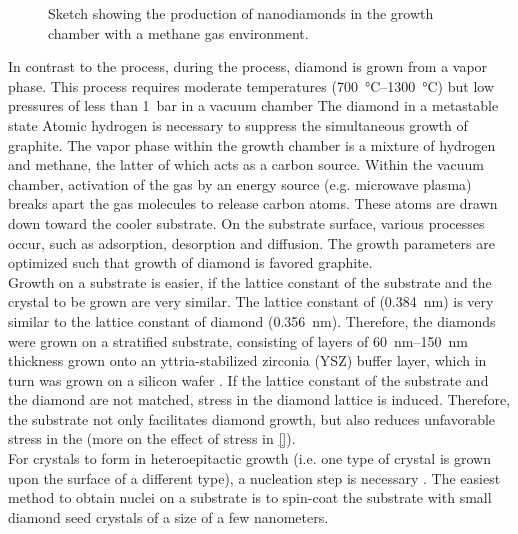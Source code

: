 	\begin{figure}[tp]
		\centering
		\caption{Sketch showing the production of \CVD nanodiamonds in the growth chamber with a methane gas environment.}
		\label{fig::cvd_sketch}
	\end{figure}

	In contrast to the \HPHT process,  during the \cvd process, diamond is grown from a vapor phase.
	This process requires moderate temperatures (\SIrange{700}{1300}{\celsius}) but low pressures of less than \SI{1}{\bar} in a vacuum chamber \cite{}
	The diamond in a metastable state
	Atomic hydrogen is necessary to suppress the simultaneous growth of graphite.
	The vapor phase within the growth chamber is a mixture of hydrogen and methane, the latter of which acts as a carbon source.
	Within the vacuum chamber, activation of the gas by an energy source (e.g. microwave plasma) breaks apart the gas molecules to release carbon atoms.
	These atoms are drawn down toward the cooler substrate.
	On the substrate surface, various processes occur, such as adsorption, desorption and diffusion.
	The growth parameters are optimized such that growth of diamond is favored \wrt graphite.
	\\
	Growth on a substrate is easier, if the lattice constant of the substrate and the crystal to be grown are very similar.
	The lattice constant of \ir (\SI{0.384}{nm}\cite{Arblaster2010,Gsell2007}) is very similar to the lattice constant of diamond (\SI{0.356}{nm}\cite{Davis1993}).
	Therefore, the diamonds were grown on a stratified substrate, consisting of \ir layers of \SIrange{60}{150}{nm} thickness grown onto an yttria-stabilized zirconia (YSZ) buffer layer, which in turn was grown on a silicon wafer \cite{Gsell2004a}.
	If the lattice constant of the substrate and the diamond are not matched, stress in the diamond lattice is induced.
	Therefore, the \ir substrate not only facilitates diamond growth, but also reduces unfavorable stress in the \nds (more on the effect of stress in \autoref{}).
	\\
	For crystals to form in heteroepitactic growth (i.e. one type of crystal is grown upon the surface of a different type), a nucleation step is necessary \cite{Schreck2014a}.
	The easiest method to obtain nuclei on a substrate is to spin-coat the substrate with small diamond seed crystals of a size of a few nanometers.
